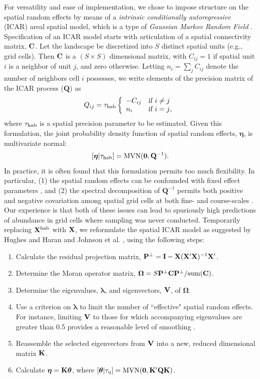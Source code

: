 \documentclass[10pt]{article}
\newcommand{\bn}{\ensuremath{\boldsymbol{\eta}}}
\newcommand{\bQ}{\ensuremath{\mathbf{Q}}}
\begin{document}
For versatility and ease of implementation, we chose to impose structure on the spatial random effects by means of a \emph{intrinsic conditionally autoregressive} (ICAR) areal spatial model, which is a type of \emph{Gaussian Markov Random Field} \cite{BesagEtAl1991,BesagKooperberg1995,RueHeld2005}.   Specification of an ICAR model starts with articulation of a spatial connectivity matrix, ${\bf C}$.  Let the landscape be discretized into $S$ distinct spatial units (e.g., grid cells).  Then ${\bf C}$ is a $(S \times S)$ dimensional matrix, with $C_{ij}=1$ if spatial unit $i$ is a neighbor of unit $j$, and zero otherwise.  Letting $n_i=\sum_j C_{ij}$ denote the number of neighbors cell $i$ possesses,
we write elements of the precision matrix of the ICAR process ($\bQ$) as
$$
Q_{ij} = \tau_{\rm hab}\left\{\begin{array}{ll}
				-C_{ij} & \mbox{if $i\ne j$}\\
				n_i & \mbox{if $i=j$,}
				\end{array}\right.
$$
where $\tau_{\rm hab}$ is a spatial precision parameter to be estimated.
Given this formulation, the joint probability density function of spatial random effects, $\bn$, is multivariate normal:
$$
[\bn|\tau_{\rm hab}] = {\rm MVN}(\mathbf{0},\bQ^{-1}).
$$
In practice, it is often found that this formulation permits too much flexibility.  In particular, (1) the spatial random effects can be confounded with fixed effect parameters \cite{ReichEtAl2006,HodgesReich2010}, and (2) the spectral decomposition
of $\bQ^{-1}$ permits both positive and negative covariation among spatial grid cells at both fine- and course-scales \cite{HughesHaran2012}.  Our experience is that both of these issues can lead to spuriously high predictions of abundance in grid cells where sampling was never conducted.  Temporarily replacing ${\bf X}^{\rm hab}$ with ${\bf X}$, we reformulate the spatial ICAR model as suggested by Hughes and Haran \cite{HughesHaran2012} and Johnson et al. \cite{JohnsonEtAl2012}, using the following steps:
\begin{enumerate}
 \item Calculate the residual projection matrix, ${\bf P}^\bot = {\bf I}-{\bf X}({\bf X}^\prime{\bf X})^{-1}{\bf X}^\prime$.
 \item Determine the Moran operator matrix, $\boldsymbol{\Omega}=S {\bf P}^\bot {\bf C}{\bf P}^\bot / {\rm sum}({\bf C})$.
 \item Determine the eigenvalues, $\boldsymbol{\lambda}$, and eigenvectors, ${\bf V}$, of $\boldsymbol{\Omega}$.
 \item Use a criterion on $\boldsymbol{\lambda}$ to limit the number of ``effective" spatial random effects.  For instance, limiting ${\bf V}$ to those for which accompanying eigenvalues are greater than 0.5 provides a reasonable level of smoothing \cite{JohnsonEtAl2012}.
 \item Reassemble the selected eigenvectors from ${\bf V}$ into a new, reduced dimensional matrix ${\bf K}$.
 \item Calculate $\boldsymbol{\eta}={\bf K}\boldsymbol{\theta}$, where $[\boldsymbol{\theta}|\tau_{\eta}]= {\rm MVN}({\bf 0},{\bf K}^\prime \bQ {\bf K})$.
\end{enumerate}
\end{document}
